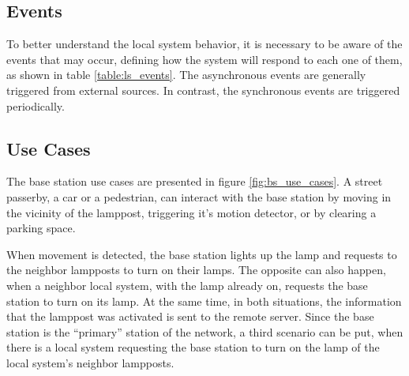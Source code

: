 \subsection{Events}
To better understand the local system behavior, it is necessary to be aware of the events that may occur, defining how the system will respond to each one of them, as shown in table \ref{table:ls_events}. The asynchronous events are generally triggered from external sources. In contrast, the synchronous events are triggered periodically.

\begin{table}[h]
	\centering
	
	\caption{Local system events.}
	\label{table:ls_events}
\end{table}

\subsection{Use Cases}
The base station use cases are presented in figure \ref{fig:bs_use_cases}. A street passerby, a car or a pedestrian, can interact with the base station by moving in the vicinity of the lamppost, triggering it's motion detector, or by clearing a parking space.

When movement is detected, the base station lights up the lamp and requests to the neighbor lampposts to turn on their lamps. The opposite can also happen, when a neighbor local system, with the lamp already on, requests the base station to turn on its lamp. At the same time, in both situations, the information that the lamppost was activated is sent to the remote server. Since the base station is the “primary” station of the network, a third scenario can be put, when there is a local system requesting the base station to turn on the lamp of the local system's neighbor lampposts.

